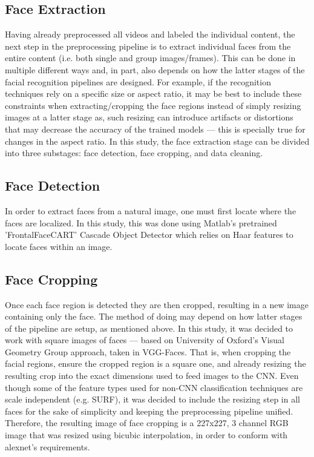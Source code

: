 \documentclass[11pt]{article}
\begin{document}
    \subsection{Face Extraction}
        Having already preprocessed all videos and labeled the individual content, the next step in the preprocessing pipeline is to extract individual faces from the entire content (i.e. both single and group images/frames). This can be done in multiple different ways and, in part, also depends on how the latter stages of the facial recognition pipelines are designed. For example, if the recognition techniques rely on a specific size or aspect ratio, it may be best to include these constraints when extracting/cropping the face regions instead of simply resizing images at a latter stage as, such resizing can introduce artifacts or distortions that may decrease the accuracy of the trained models --- this is specially true for changes in the aspect ratio. In this study, the face extraction stage can be divided into three substages: face detection, face cropping, and data cleaning.

        \subsection{Face Detection}
            In order to extract faces from a natural image, one must first locate where the faces are localized. In this study, this was done using Matlab's pretrained 'FrontalFaceCART' Cascade Object Detector which relies on Haar features to locate faces within an image.

        \subsection{Face Cropping}
            Once each face region is detected they are then cropped, resulting in a new image containing only the face. The method of doing may depend on how latter stages of the pipeline are setup, as mentioned above. In this study, it was decided to work with square images of faces --- based on University of Oxford's Visual Geometry Group approach, taken in VGG-Faces. That is, when cropping the facial regions, ensure the cropped region is a square one, and already resizing the resulting crop into the exact dimensions used to feed images to the CNN. Even though some of the feature types used for non-CNN classification techniques are scale independent (e.g. SURF), it was decided to include the resizing step in all faces for the sake of simplicity and keeping the preprocessing pipeline unified. Therefore, the resulting image of face cropping is a 227x227, 3 channel RGB image that was resized using bicubic interpolation, in order to conform with alexnet's requirements.
\end{document}
